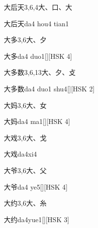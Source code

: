 \begin{entry}{大后天}{3,6,4}{⼤、⼝、⼤}
  \begin{phonetics}{大后天}{da4 hou4 tian1}
  \end{phonetics}
\end{entry}

\begin{entry}{大多}{3,6}{⼤、⼣}
  \begin{phonetics}{大多}{da4 duo1}[][HSK 4]
  \end{phonetics}
\end{entry}

\begin{entry}{大多数}{3,6,13}{⼤、⼣、⽁}
  \begin{phonetics}{大多数}{da4 duo1 shu4}[][HSK 2]
  \end{phonetics}
\end{entry}

\begin{entry}{大妈}{3,6}{⼤、⼥}
  \begin{phonetics}{大妈}{da4 ma1}[][HSK 4]
  \end{phonetics}
\end{entry}

\begin{entry}{大戏}{3,6}{⼤、⼽}
  \begin{phonetics}{大戏}{da4xi4}
  \end{phonetics}
\end{entry}

\begin{entry}{大爷}{3,6}{⼤、⽗}
  \begin{phonetics}{大爷}{da4 ye5}[][HSK 4]
  \end{phonetics}
\end{entry}

\begin{entry}{大约}{3,6}{⼤、⽷}
  \begin{phonetics}{大约}{da4yue1}[][HSK 3]
  \end{phonetics}
\end{entry}

